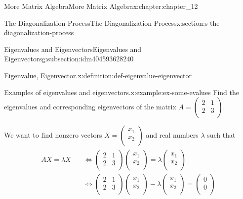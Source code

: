 \documentclass[twoside,10pt,]{book}
\numberwithin{equation}{section}
\begin{document}
\begin{chapterptx}{More Matrix Algebra}{}{More Matrix Algebra}{}{}{x:chapter:chapter_12}
\begin{sectionptx}{The Diagonalization Process}{}{The Diagonalization Process}{}{}{x:section:s-the-diagonalization-process}
\begin{subsectionptx}{Eigenvalues and Eigenvectors}{}{Eigenvalues and Eigenvectors}{}{}{g:subsection:idm404593628240}
\begin{definition}{Eigenvalue, Eigenvector.}{x:definition:def-eigenvalue-eigenvector}
\end{definition}
\begin{example}{Examples of eigenvalues and eigenvectors.}{x:example:ex-some-evalues}%
Find the eigenvalues and corresponding eigenvectors of the matrix \(A=\left(
\begin{array}{cc}
2 & 1 \\
2 & 3 \\
\end{array}
\right)\).%
\par
We want to find nonzero vectors  \(X = \left(
\begin{array}{c}
x_1 \\
x_2 \\
\end{array}
\right)\) and real numbers \(\lambda\)  such that%
\begin{align}
\begin{split}
A X = \lambda  X \quad &\Leftrightarrow \left(
\begin{array}{cc}
2 & 1 \\
2 & 3 \\
\end{array}
\right)\left(
\begin{array}{c}
x_1 \\
x_2 \\
\end{array}
\right) = \lambda  \left(
\begin{array}{c}
x_1 \\
x_2 \\
\end{array}
\right)\\
& \Leftrightarrow \left(
\begin{array}{cc}
2 & 1 \\
2 & 3 \\
\end{array}
\right)\left(
\begin{array}{c}
x_1 \\
x_2 \\
\end{array}
\right) - \lambda  \left(
\begin{array}{c}
x_1 \\
x_2 \\
\end{array}
\right)=\left(
\begin{array}{c}
0 \\
0 \\
\end{array}
\right)\\

\end{split}
\end{align}
\end{example}
\end{subsectionptx}
\end{sectionptx}
\end{chapterptx}
\end{document}

